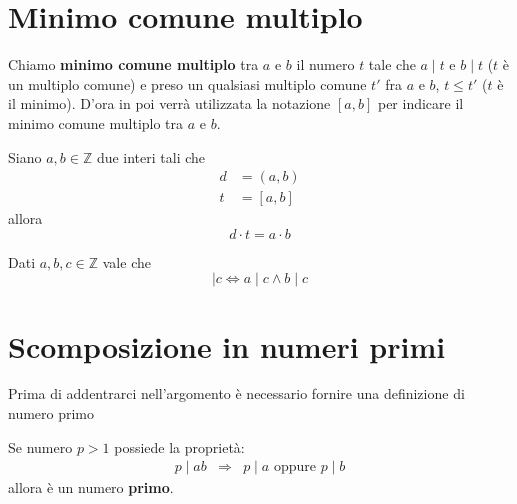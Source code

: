 \section{Minimo comune multiplo}

\begin{defn}
	Chiamo \textbf{minimo comune multiplo} tra $a$ e $b$ il numero $t$ tale che $a \mid t$
	e $b \mid t$ ($t$ \`e un multiplo comune) e preso un qualsiasi multiplo comune $t'$ fra
	$a$ e $b$, $t \leq t'$ ($t$ \`e il minimo). D'ora in poi verr\`a utilizzata la notazione
	$[a, b]$ per indicare il minimo comune multiplo tra $a$ e $b$.
\end{defn}

\begin{proposition}
	Siano $a, b \in \mathbb{Z}$ due interi tali che
	\begin{equation*}
		\begin{array}{ll}
			d & = (a, b) \\
			t & = [a, b]
		\end{array}
	\end{equation*}
	allora
	\begin{equation*}
		d \cdot t = a \cdot b
	\end{equation*}
\end{proposition}

\begin{proposition}
	Dati $a, b, c \in \mathbb{Z}$ vale che
	\begin{equation*}
		[a, b] \mid c \Leftrightarrow a \mid c \wedge b \mid c
	\end{equation*}
\end{proposition}

\section{Scomposizione in numeri primi}
Prima di addentrarci nell'argomento \`e necessario fornire una definizione di numero primo

\begin{defn}
	Se numero $p > 1$ possiede la propriet\`a:
	\begin{equation*}
		\begin{array}{rcl}
			p \mid ab & \Rightarrow & p \mid a \text{ oppure } p \mid b
		\end{array}
	\end{equation*}
	allora \`e un numero \textbf{primo}.
\end{defn}

